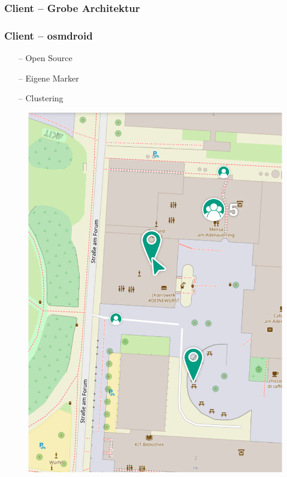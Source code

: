 \documentclass[aspectratio=1610]{beamer}
\begin{document}
  \begin{frame}[plain]
      \frametitle{\textbf{Client} -- Grobe Architektur}
  \end{frame}

  \begin{frame}[plain]
      \frametitle{\textbf{Client} -- osmdroid}
	\begin{minipage}{0.45\textwidth}
          \begin{itemize}
              \item[--] Open Source
              \item[--] Eigene Marker
              \item[--] Clustering
          \end{itemize}
      \end{minipage}
      \begin{minipage}{0.5\textwidth}
          \begin{figure}
              \includegraphics[width = \columnwidth - 30pt]{images/gui-mockups/osm_map.png}
          \end{figure}
      \end{minipage}
  \end{frame}
\end{document}
